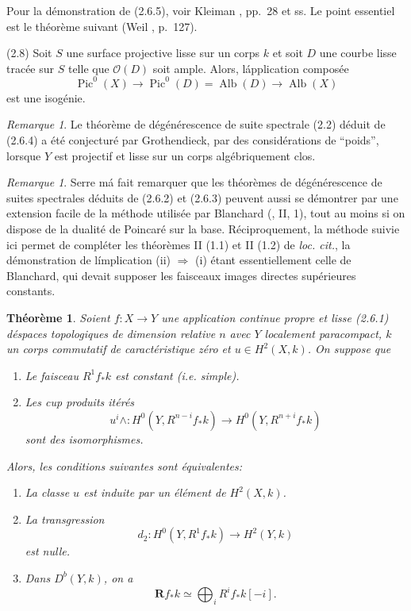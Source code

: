 \documentclass[12pt]{amsart}
\theoremstyle{plain}
\newtheorem{thm}[prop]{Th\'eor\`eme}
\theoremstyle{remark}
\newtheorem{rem}[prop]{Remarque}
\DeclareMathOperator{\Pic}{Pic}
\DeclareMathOperator{\Alb}{Alb}
\newcommand{\cO}{\mathscr{O}}
\newcommand{\Rf}{\mathbf{R}f_*}
\newcommand{\db}{D^b}
\begin{document}
Pour la d\'emonstration de (2.6.5), voir Kleiman \cite{Kleiman}, pp.~28 et ss. Le point essentiel est le th\'eor\`eme suivant (Weil \cite{Weil2}, p.~127).

(2.8) Soit $S$ une surface projective lisse sur un corps $k$ et soit $D$ une courbe lisse trac\'ee sur $S$ telle que $\cO(D)$ soit ample. Alors, l\'application compos\'ee
\[
\Pic^0(X) \longrightarrow \Pic^0(D) = \Alb(D) \longrightarrow \Alb(X)
\]
est une isog\'enie.

\begin{rem}\label{rem:2.9}
Le th\'eor\`eme de d\'eg\'en\'erescence de suite spectrale (2.2) d\'eduit de (2.6.4) a \'et\'e conjectur\'e par Grothendieck, par des consid\'erations de ``poids'', lorsque $Y$ est projectif et lisse sur un corps alg\'ebriquement clos.
\end{rem}

\begin{rem}\label{rem:2.10}
Serre m\'a fait remarquer que les th\'eor\`emes de d\'eg\'en\'erescence de suites spectrales d\'eduits de (2.6.2) et (2.6.3) peuvent aussi se d\'emontrer par une extension facile de la m\'ethode utilis\'ee par Blanchard (\cite{Blanchard}, II, 1), tout au moins si on dispose de la dualit\'e de Poincar\'e sur la base. R\'eciproquement, la m\'ethode suivie ici permet de compl\'eter les th\'eor\`emes II (1.1) et II (1.2) de \textit{loc. cit.}, la d\'emonstration de l\'implication (ii) $\Rightarrow$ (i) \'etant essentiellement celle de Blanchard, qui devait supposer les faisceaux images directes sup\'erieures constants.
\end{rem}

\begin{thm}\label{thm:2.11}
Soient $f: X \to Y$ une application continue propre et lisse (2.6.1) d\'espaces topologiques de dimension relative $n$ avec $Y$ localement paracompact, $k$ un corps commutatif de caract\'eristique z\'ero et $u \in H^2(X, k)$. On suppose que
\begin{enumerate}
\item[(a)] Le faisceau $R^1f_*k$ est constant (i.e. simple).
\item[(b)] Les cup produits it\'er\'es
\[
u^i \wedge : H^0(Y, R^{n-i}f_*k) \longrightarrow H^0(Y, R^{n+i}f_*k)
\]
sont des isomorphismes.
\end{enumerate}
Alors, les conditions suivantes sont \'equivalentes:
\begin{enumerate}
\item[(i)] La classe $u$ est induite par un \'el\'ement de $H^2(X, k)$.
\item[(ii)] La transgression
\[
d_2 : H^0(Y, R^1f_*k) \longrightarrow H^2(Y, k)
\]
est nulle.
\item[(iii)] Dans $\db(Y, k)$, on a
\[
\Rf k \simeq \bigoplus_i R^if_*k[-i].
\]
\end{enumerate}
\end{thm}
\end{document}
